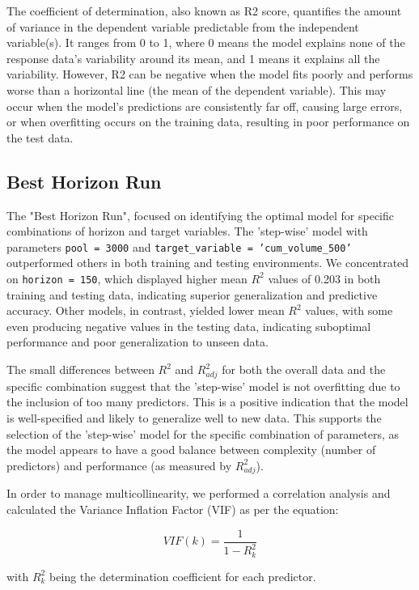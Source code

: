 \documentclass{article}
\begin{document}
The coefficient of determination, also known as R2 score, quantifies the amount of variance in the dependent variable predictable from the independent variable(s). It ranges from 0 to 1, where 0 means the model explains none of the response data's variability around its mean, and 1 means it explains all the variability. However, R2 can be negative when the model fits poorly and performs worse than a horizontal line (the mean of the dependent variable). This may occur when the model's predictions are consistently far off, causing large errors, or when overfitting occurs on the training data, resulting in poor performance on the test data.

\subsection{Best Horizon Run}\label{sec:model-optimization}
The "Best Horizon Run", focused on identifying the optimal model for specific combinations of horizon and target variables. The 'step-wise' model with parameters \texttt{pool = 3000} and \texttt{target\_variable = 'cum\_volume\_500'} outperformed others in both training and testing environments. We concentrated on \texttt{horizon = 150}, which displayed higher mean $R^2$ values of 0.203 in both training and testing data, indicating superior generalization and predictive accuracy. Other models, in contrast, yielded lower mean $R^2$ values, with some even producing negative values in the testing data, indicating suboptimal performance and poor generalization to unseen data.

The small differences between \(R^2\) and \(R^2_{adj}\) for both the overall data and the specific combination suggest that the 'step-wise' model is not overfitting due to the inclusion of too many predictors. This is a positive indication that the model is well-specified and likely to generalize well to new data. This supports the selection of the 'step-wise' model for the specific combination of parameters, as the model appears to have a good balance between complexity (number of predictors) and performance (as measured by \(R^2_{adj}\)).

In order to manage multicollinearity, we performed a correlation analysis and calculated the Variance Inflation Factor (VIF) as per the equation:

\begin{equation}
  VIF(k) = \frac{1}{1 - R^2_k}
\end{equation}

with $R^2_k$ being the determination coefficient for each predictor.
\end{document}
